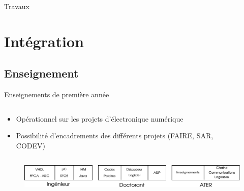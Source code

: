 \documentclass[t,compress,mathserif,12pt,xcolor=dvipsnames]{beamer}
\begin{document}
\begin{frame}[t]{Travaux}

\end{frame}

\section{Intégration}
\subsection{Enseignement}
\begin{frame}[t]{Enseignements de première année}
  \begin{minipage}[t][5.0cm][t]{\textwidth}
    \begin{columns}
      \begin{column}{0.63\textwidth}
        \vspace{-30pt}
          \begin{itemize}
            \item Opérationnel sur les projets d'électronique numérique 
            \item Possibilité d'encadrements des différents projets (FAIRE, SAR, CODEV)
          \end{itemize}
      \end{column}
      \begin{column}{0.04\textwidth}

      \end{column}
      \begin{column}{0.33\textwidth}
      \end{column}
    \end{columns}
  \end{minipage}
  \begin{figure}[htp]
    \centering
    \includegraphics[width=\textwidth]{fig/frise}
  \end{figure}


\end{frame}
\end{document}
